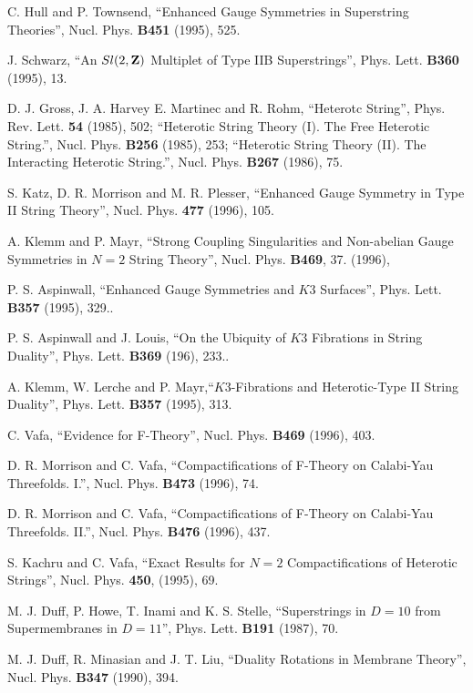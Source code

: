 \begin{thebibliography}{99}
 C. Hull and P. Townsend, ``Enhanced Gauge Symmetries in Superstring Theories'',
Nucl. Phys. {\bf B451} (1995), 525.

 J. Schwarz, ``An $Sl(2,{\bf Z})$ Multiplet of 
Type IIB Superstrings'', Phys. Lett. {\bf B360} (1995), 13.

 D. J. Gross, J. A. Harvey E. Martinec and R.
Rohm, ``Heterotc String'', Phys. Rev. Lett. {\bf 54} (1985), 502; 
``Heterotic String Theory (I). The Free Heterotic
String.'', Nucl. Phys. {\bf B256} (1985), 253; ``Heterotic String Theory (II). The 
Interacting Heterotic String.'', Nucl. Phys. {\bf B267} (1986), 75. 

 S. Katz, D. R. Morrison and M. R. Plesser, ``Enhanced Gauge 
Symmetry in Type II String Theory'', Nucl. Phys. {\bf 477} (1996), 105.

 A. Klemm and P. Mayr, ``Strong Coupling Singularities and Non-abelian Gauge 
Symmetries in $N=2$ String Theory'', Nucl. Phys. {\bf B469}, 37.
(1996), 

 P. S. Aspinwall, ``Enhanced Gauge Symmetries and $K3$ Surfaces'', 
Phys. Lett. {\bf B357} (1995), 329..

 P. S. Aspinwall and J. Louis, ``On the Ubiquity of $K3$ Fibrations 
in String Duality'', Phys. Lett. {\bf B369} (196), 233..

 A. Klemm, W. Lerche and P. Mayr,``$K3$-Fibrations and 
Heterotic-Type II String Duality'', Phys. Lett. {\bf B357} (1995), 313.

 C. Vafa, ``Evidence for F-Theory'', Nucl. Phys. {\bf
B469} (1996), 403.

 D. R. Morrison and C. Vafa, ``Compactifications of
F-Theory on Calabi-Yau Threefolds. I.'', Nucl. Phys. {\bf B473}
(1996), 74. 

 D. R. Morrison and C. Vafa, ``Compactifications of
F-Theory on Calabi-Yau Threefolds. II.'', Nucl. Phys. {\bf B476}
(1996), 437. 

 S. Kachru and C. Vafa, ``Exact Results for $N=2$
Compactifications of Heterotic Strings'', Nucl. Phys. {\bf 450},
(1995), 69.

 M. J. Duff, P. Howe, T. Inami and K. S. Stelle,
``Superstrings in $D=10$ from Supermembranes in $D=11$'', Phys.
Lett. {\bf B191} (1987), 70.

M. J. Duff, R. Minasian and J. T. Liu, ``Duality Rotations in
Membrane Theory'', Nucl. Phys. {\bf B347} (1990), 394.
  

\end{thebibliography}
